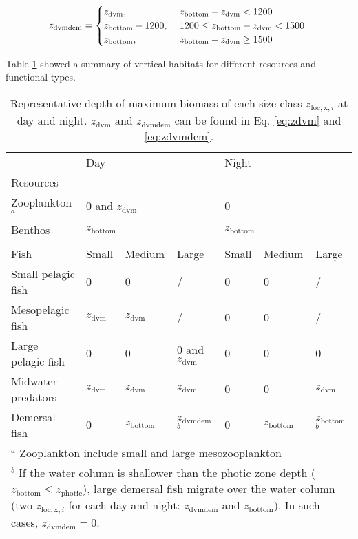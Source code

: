 \documentclass[
]{article}
\begin{document}
\begin{equation}
  z_{\mathrm{dvmdem}} =
  \begin{cases}
     z_{\mathrm{dvm}}, & \text{ $ z_{\mathrm{bottom}} - z_{\mathrm{dvm}} < 1200 $ } \\
     z_{\mathrm{bottom}} - 1200, & \text{ $ 1200 \leq z_{\mathrm{bottom}} - z_{\mathrm{dvm}} <1500 $ } \\
     z_{\mathrm{bottom}}, & \text{ $ z_{\mathrm{bottom}} - z_{\mathrm{dvm}} \geq 1500 $ }      
  \end{cases}
\label{eq:zdvmdem}
\end{equation}

Table \ref{tab:vertloc} showed a summary of vertical habitats for
different resources and functional types.

\begin{table}[H]

\centering
\caption{ Representative depth of maximum biomass of each size class $z_{\mathrm{loc},\mathrm{x},i}$ at day and night. $z_{\mathrm{dvm}}$ and $z_{\mathrm{dvmdem}}$ can be found in Eq. \ref{eq:zdvm} and \ref{eq:zdvmdem}.}
\label{tab:vertloc}

\begin{tabular}{ l l l p{2cm} l l p{2cm}}
\hline
 & \multicolumn{3}{l}{Day} & \multicolumn{3}{l}{Night} \\
   \cline{2-7} 
Resources\\
\hline
Zooplankton$^a$ & \multicolumn{3}{l}{0 and $z_{\mathrm{dvm}}$} & \multicolumn{3}{l}{0} \\
Benthos & \multicolumn{3}{l}{$z_{\mathrm{bottom}}$} & \multicolumn{3}{l}{$z_{\mathrm{bottom}}$} \\
   \cline{2-7}
&\\   
Fish & Small & Medium & Large & Small & Medium & Large \\
\hline
Small pelagic fish & 0 & 0 & / & 0 & 0 & / \\
Mesopelagic fish & $z_{\mathrm{dvm}}$ & $z_{\mathrm{dvm}}$ & / & 0 & 0 & / \\
Large pelagic fish & 0 & 0 & 0 and $z_{\mathrm{dvm}}$ & 0 & 0 & 0 \\
Midwater predators & $z_{\mathrm{dvm}}$ & $z_{\mathrm{dvm}}$ & $z_{\mathrm{dvm}}$ & 0 & 0 & $z_{\mathrm{dvm}}$ \\
Demersal fish & 0 & $z_{\mathrm{bottom}}$ & $z_{\mathrm{dvmdem}}$$^b$ & 0 & $z_{\mathrm{bottom}}$ & $z_{\mathrm{bottom}}$$^b$ \\

\hline
\multicolumn{7}{l}{\footnotesize $^a$ Zooplankton include small and large mesozooplankton} \\
\multicolumn{7}{p{\dimexpr\linewidth-2\tabcolsep}}{\footnotesize $^b$ If the water column is shallower than the photic zone depth ($z_{\mathrm{bottom}} \leq z_{\mathrm{photic}}$), large demersal fish migrate over the water column (two  $z_{\mathrm{loc},\mathrm{x},i}$ for each day and night: $z_{\mathrm{dvmdem}}$ and $z_{\mathrm{bottom}}$). In such cases, $z_{\mathrm{dvmdem}}=0$.}

\end{tabular}
\end{table}
\end{document}
